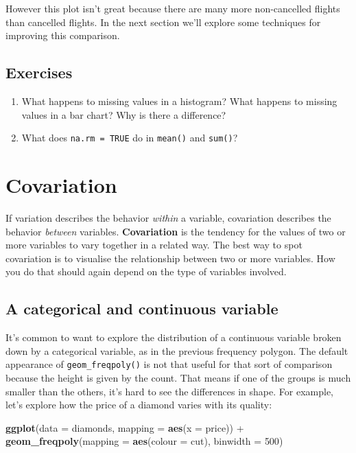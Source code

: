 \documentclass[]{book}
\newenvironment{Shaded}{\begin{snugshade}}{\end{snugshade}}
\newcommand{\KeywordTok}[1]{\textcolor[rgb]{0.13,0.29,0.53}{\textbf{{#1}}}}
\newcommand{\DataTypeTok}[1]{\textcolor[rgb]{0.13,0.29,0.53}{{#1}}}
\newcommand{\DecValTok}[1]{\textcolor[rgb]{0.00,0.00,0.81}{{#1}}}
\newcommand{\StringTok}[1]{\textcolor[rgb]{0.31,0.60,0.02}{{#1}}}
\newcommand{\NormalTok}[1]{{#1}}
\begin{document}
However this plot isn't great because there are many more non-cancelled
flights than cancelled flights. In the next section we'll explore some
techniques for improving this comparison.

\subsection{Exercises}\label{exercises-14}

\begin{enumerate}
\def\labelenumi{\arabic{enumi}.}
\item
  What happens to missing values in a histogram? What happens to missing
  values in a bar chart? Why is there a difference?
\item
  What does \texttt{na.rm\ =\ TRUE} do in \texttt{mean()} and
  \texttt{sum()}?
\end{enumerate}

\section{Covariation}\label{covariation}

If variation describes the behavior \emph{within} a variable,
covariation describes the behavior \emph{between} variables.
\textbf{Covariation} is the tendency for the values of two or more
variables to vary together in a related way. The best way to spot
covariation is to visualise the relationship between two or more
variables. How you do that should again depend on the type of variables
involved.

\hypertarget{cat-cont}{\subsection{A categorical and continuous
variable}\label{cat-cont}}

It's common to want to explore the distribution of a continuous variable
broken down by a categorical variable, as in the previous frequency
polygon. The default appearance of \texttt{geom\_freqpoly()} is not that
useful for that sort of comparison because the height is given by the
count. That means if one of the groups is much smaller than the others,
it's hard to see the differences in shape. For example, let's explore
how the price of a diamond varies with its quality:

\begin{Shaded}
\begin{Highlighting}[]
\KeywordTok{ggplot}\NormalTok{(}\DataTypeTok{data =} \NormalTok{diamonds, }\DataTypeTok{mapping =} \KeywordTok{aes}\NormalTok{(}\DataTypeTok{x =} \NormalTok{price)) +}\StringTok{ }
\StringTok{  }\KeywordTok{geom_freqpoly}\NormalTok{(}\DataTypeTok{mapping =} \KeywordTok{aes}\NormalTok{(}\DataTypeTok{colour =} \NormalTok{cut), }\DataTypeTok{binwidth =} \DecValTok{500}\NormalTok{)}
\end{Highlighting}
\end{Shaded}
\end{document}
